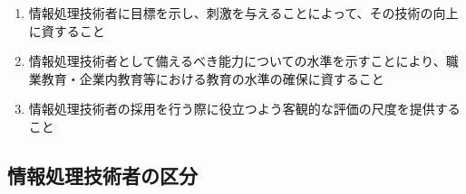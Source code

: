 


\begin{enumerate}
\item 情報処理技術者に目標を示し、刺激を与えることによって、その技術の向上に資すること
\item 情報処理技術者として備えるべき能力についての水準を示すことにより、職業教育・企業内教育等における教育の水準の確保に資すること
\item 情報処理技術者の採用を行う際に役立つよう客観的な評価の尺度を提供すること
\end{enumerate}

\subsection{情報処理技術者の区分\TBW}
